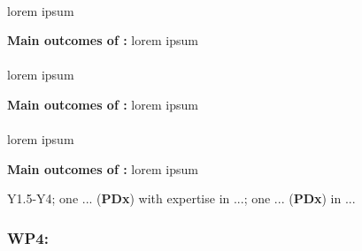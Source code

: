 \paragraph{\TCA}

lorem ipsum

\begin{framed}
    {\noindent\bf Main outcomes of \tCA:} lorem ipsum 
\end{framed}

\paragraph{\TCB}

lorem ipsum

\begin{framed}
    {\noindent\bf Main outcomes of \tCB:} lorem ipsum 
\end{framed}

\paragraph{\TCC}

lorem ipsum

\begin{framed}
    {\noindent\bf Main outcomes of \tCC:} lorem ipsum 
\end{framed}


\begin{framed}
     Y1.5-Y4; one ... ({\bf PDx}) with expertise in
    ...; one ... ({\bf PDx}) in ...
\end{framed}











\subsubsection{WP4: \textbf{\WPD}}


